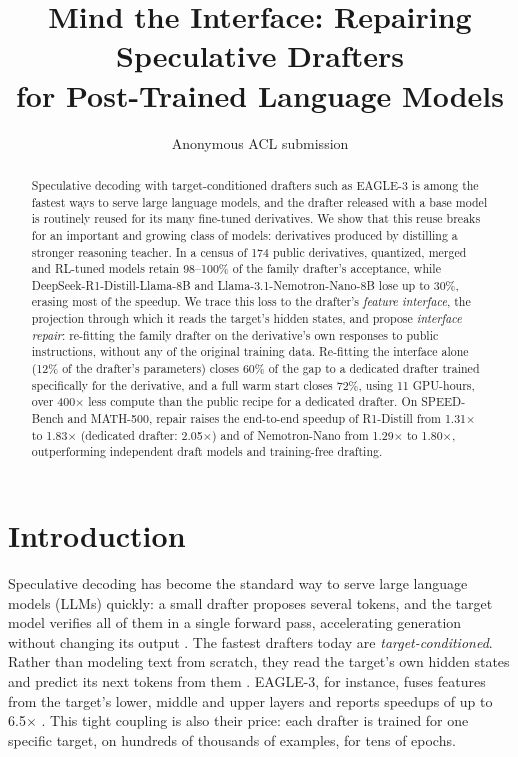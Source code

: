 \documentclass[11pt]{article}
\title{Mind the Interface: Repairing Speculative Drafters\\for Post-Trained Language Models}
\author{Anonymous ACL submission}
\newcommand{\ours}{interface repair}
\begin{document}
\maketitle

\begin{abstract}
Speculative decoding with target-conditioned drafters such as EAGLE-3 is among the fastest ways to serve large language models, and the drafter released with a base model is routinely reused for its many fine-tuned derivatives.
We show that this reuse breaks for an important and growing class of models: derivatives produced by distilling a stronger reasoning teacher.
In a census of 174 public derivatives, quantized, merged and RL-tuned models retain 98--100\% of the family drafter's acceptance, while DeepSeek-R1-Distill-Llama-8B and Llama-3.1-Nemotron-Nano-8B lose up to 30\%, erasing most of the speedup.
We trace this loss to the drafter's \emph{feature interface}, the projection through which it reads the target's hidden states, and propose \emph{\ours{}}: re-fitting the family drafter on the derivative's own responses to public instructions, without any of the original training data.
Re-fitting the interface alone (12\% of the drafter's parameters) closes 60\% of the gap to a dedicated drafter trained specifically for the derivative, and a full warm start closes 72\%, using 11 GPU-hours, over 400$\times$ less compute than the public recipe for a dedicated drafter.
On SPEED-Bench and MATH-500, repair raises the end-to-end speedup of R1-Distill from 1.31$\times$ to 1.83$\times$ (dedicated drafter: 2.05$\times$) and of Nemotron-Nano from 1.29$\times$ to 1.80$\times$, outperforming independent draft models and training-free drafting.
\end{abstract}

\section{Introduction}

Speculative decoding has become the standard way to serve large language models (LLMs) quickly: a small drafter proposes several tokens, and the target model verifies all of them in a single forward pass, accelerating generation without changing its output \citep{leviathan2023speculative,chen2023accelerating}.
The fastest drafters today are \emph{target-conditioned}.
Rather than modeling text from scratch, they read the target's own hidden states and predict its next tokens from them \citep{cai2024medusa,li2024eagle,li2025eagle3,chen2026dflash}.
EAGLE-3, for instance, fuses features from the target's lower, middle and upper layers and reports speedups of up to 6.5$\times$ \citep{li2025eagle3}.
This tight coupling is also their price: each drafter is trained for one specific target, on hundreds of thousands of examples, for tens of epochs.
\end{document}
